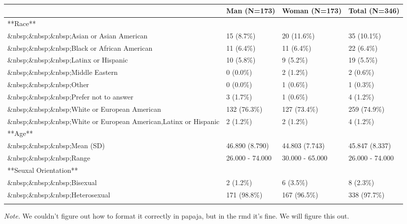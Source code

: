 \documentclass[
  man]{apa6}
\begin{document}
\begin{table}[tbp]

\begin{center}
\begin{threeparttable}

\caption{\label{tab:unnamed-chunk-4}}

\scriptsize{

\begin{tabular}{llll}
\toprule
 & \multicolumn{1}{c}{Man (N=173)} & \multicolumn{1}{c}{Woman (N=173)} & \multicolumn{1}{c}{Total (N=346)}\\
\midrule
**Race** &  &  & \\
\&nbsp;\&nbsp;\&nbsp;Asian or Asian American & 15 (8.7\%) & 20 (11.6\%) & 35 (10.1\%)\\
\&nbsp;\&nbsp;\&nbsp;Black or African American & 11 (6.4\%) & 11 (6.4\%) & 22 (6.4\%)\\
\&nbsp;\&nbsp;\&nbsp;Latinx or Hispanic & 10 (5.8\%) & 9 (5.2\%) & 19 (5.5\%)\\
\&nbsp;\&nbsp;\&nbsp;Middle Eastern & 0 (0.0\%) & 2 (1.2\%) & 2 (0.6\%)\\
\&nbsp;\&nbsp;\&nbsp;Other & 0 (0.0\%) & 1 (0.6\%) & 1 (0.3\%)\\
\&nbsp;\&nbsp;\&nbsp;Prefer not to answer & 3 (1.7\%) & 1 (0.6\%) & 4 (1.2\%)\\
\&nbsp;\&nbsp;\&nbsp;White or European American & 132 (76.3\%) & 127 (73.4\%) & 259 (74.9\%)\\
\&nbsp;\&nbsp;\&nbsp;White or European American,Latinx or Hispanic & 2 (1.2\%) & 2 (1.2\%) & 4 (1.2\%)\\
**Age** &  &  & \\
\&nbsp;\&nbsp;\&nbsp;Mean (SD) & 46.890 (8.790) & 44.803 (7.743) & 45.847 (8.337)\\
\&nbsp;\&nbsp;\&nbsp;Range & 26.000 - 74.000 & 30.000 - 65.000 & 26.000 - 74.000\\
**Seuxal Orientation** &  &  & \\
\&nbsp;\&nbsp;\&nbsp;Bisexual & 2 (1.2\%) & 6 (3.5\%) & 8 (2.3\%)\\
\&nbsp;\&nbsp;\&nbsp;Heterosexual & 171 (98.8\%) & 167 (96.5\%) & 338 (97.7\%)\\
\bottomrule
\addlinespace
\end{tabular}

}

\begin{tablenotes}[para]
\normalsize{\textit{Note.} We couldn't figure out how to format it correctly in papaja, but in the rmd it's fine. We will figure this out.}
\end{tablenotes}

\end{threeparttable}
\end{center}

\end{table}
\end{document}
